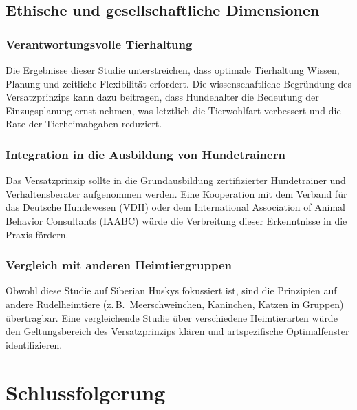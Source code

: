 ﻿\documentclass[12pt, a4paper]{article}
\theoremstyle{plain}
\theoremstyle{definition}
\theoremstyle{remark}
\begin{document}
\subsection{Ethische und gesellschaftliche Dimensionen}

\subsubsection{Verantwortungsvolle Tierhaltung}

Die Ergebnisse dieser Studie unterstreichen, dass optimale Tierhaltung
Wissen, Planung und zeitliche Flexibilität erfordert. Die wissenschaftliche
Begründung des Versatzprinzips kann dazu beitragen, dass Hundehalter die
Bedeutung der Einzugsplanung ernst nehmen, was letztlich die Tierwohlfart
verbessert und die Rate der Tierheimabgaben reduziert.

\subsubsection{Integration in die Ausbildung von Hundetrainern}

Das Versatzprinzip sollte in die Grundausbildung zertifizierter
Hundetrainer und Verhaltensberater aufgenommen werden. Eine Kooperation
mit dem Verband für das Deutsche Hundewesen (VDH) oder dem
International Association of Animal Behavior Consultants (IAABC)
würde die Verbreitung dieser Erkenntnisse in die Praxis fördern.

\subsubsection{Vergleich mit anderen Heimtiergruppen}

Obwohl diese Studie auf Siberian Huskys fokussiert ist, sind die
Prinzipien auf andere Rudelheimtiere (z.\,B.\ Meerschweinchen, Kaninchen,
Katzen in Gruppen) übertragbar. Eine vergleichende Studie über verschiedene
Heimtierarten würde den Geltungsbereich des Versatzprinzips klären und
artspezifische Optimalfenster identifizieren.

\section{Schlussfolgerung}
\label{sec:schlussfolgerung}
\end{document}
